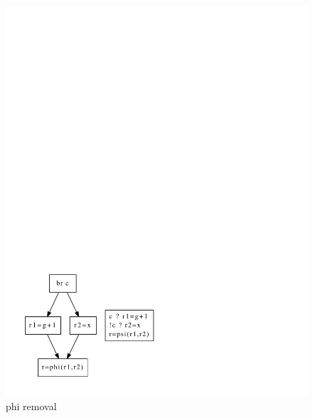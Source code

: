 \begin{figure}
\begin{minipage}[t]{5cm}
\includegraphics[scale=0.4]{phi_removal.pdf}
\caption{phi removal}
\label{fig:phi_rem}
\end{minipage}
\begin{minipage}[t]{5cm}

\end{minipage}
\end{figure}
